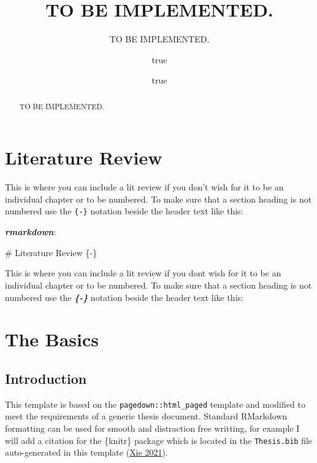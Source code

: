\documentclass[
]{article}
\title{TO BE IMPLEMENTED.}
\subtitle{TO BE IMPLEMENTED.}
\author{true}
\date{true}
\newenvironment{Shaded}{\begin{snugshade}}{\end{snugshade}}
\newcommand{\FunctionTok}[1]{\textcolor[rgb]{0.00,0.00,0.00}{#1}}
\newcommand{\InformationTok}[1]{\textcolor[rgb]{0.56,0.35,0.01}{\textbf{\textit{#1}}}}
\newcommand{\NormalTok}[1]{#1}
\begin{document}
\maketitle
\begin{abstract}
TO BE IMPLEMENTED.
\end{abstract}

\listoffigures
\listoftables
\hypertarget{literature-review}{%
\section*{Literature Review}\label{literature-review}}

This is where you can include a lit review if you don't wish for it to
be an individual chapter or to be numbered. To make sure that a section
heading is not numbered use the \texttt{\{-\}} notation beside the
header text like this:

\emph{\textbf{rmarkdown}}:

\begin{Shaded}
\begin{Highlighting}[]
\FunctionTok{\# Literature Review \{{-}\}}

\NormalTok{This is where you can include a lit review if you don\textquotesingle{}t wish for it to be an individual chapter or to be numbered. To make sure that a section heading is not numbered use the }\InformationTok{\textasciigrave{}\{{-}\}\textasciigrave{}}\NormalTok{ notation beside the header text like this:}
\end{Highlighting}
\end{Shaded}

\hypertarget{the-basics}{%
\section{The Basics}\label{the-basics}}

\hypertarget{introduction}{%
\subsection{Introduction}\label{introduction}}

This template is based on the \texttt{pagedown::html\_paged} template
and modified to meet the requirements of a generic thesis document.
Standard RMarkdown formatting can be used for smooth and distraction
free writting, for example I will add a citation for the \{knitr\}
package which is located in the \texttt{Thesis.bib} file auto-generated
in this template (\protect\hyperlink{ref-R-knitr}{Xie 2021}).
\end{document}
